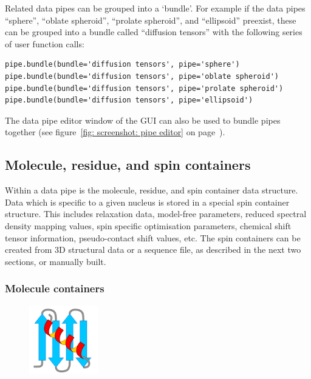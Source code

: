 Related data pipes can be grouped into a `bundle'.  For example if the data pipes ``sphere'', ``oblate spheroid'', ``prolate spheroid'', and ``ellipsoid'' preexist, these can be grouped into a bundle called ``diffusion tensors'' with the following series of user function calls:

\begin{lstlisting}
pipe.bundle(bundle='diffusion tensors', pipe='sphere')
pipe.bundle(bundle='diffusion tensors', pipe='oblate spheroid')
pipe.bundle(bundle='diffusion tensors', pipe='prolate spheroid')
pipe.bundle(bundle='diffusion tensors', pipe='ellipsoid')
\end{lstlisting}

The data pipe editor window of the GUI can also be used to bundle pipes together (see figure~\ref{fig: screenshot: pipe editor} on page~\pageref{fig: screenshot: pipe editor}).




\subsection{Molecule, residue, and spin containers}

Within a data pipe is the molecule, residue, and spin container data structure.  Data which is specific to a given nucleus is stored in a special spin container structure.  This includes relaxation data, model-free parameters, reduced spectral density mapping values, spin specific optimisation parameters, chemical shift tensor information, pseudo-contact shift values, etc.  The spin containers can be created from 3D structural data or a sequence file, as described in the next two sections, or manually built.



\subsubsection{Molecule containers}

\begin{figure}[h]
\includegraphics[width=3cm, bb=0 0 1701 1701]{graphics/misc/molecule_600x600}
\end{figure}

